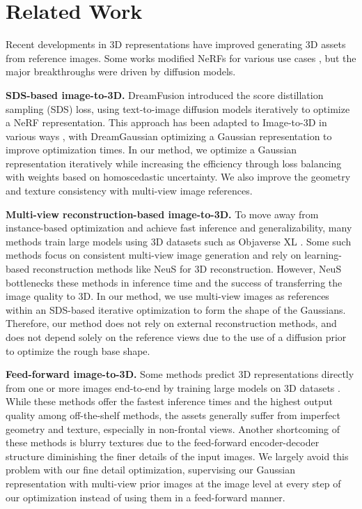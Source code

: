 \section{Related Work}
\label{related_work}
Recent developments in 3D representations have improved generating 3D assets from reference images. Some works modified NeRFs for various use cases \cite{mildenhall2020nerf, Yu_2021_CVPR, 9878785, trevithick2021grf, ZIMNY20248, JIN2024160}, but the major breakthroughs were driven by diffusion models.

\noindent \textbf{SDS-based image-to-3D. }DreamFusion \cite{poole2022dreamfusion} introduced the score distillation sampling (SDS) loss, using text-to-image diffusion models iteratively to optimize a NeRF representation. This approach has been adapted to Image-to-3D in various ways \cite{Tang_2023_ICCV, qian2024magic}, with DreamGaussian \cite{tang2024dreamgaussian} optimizing a Gaussian representation \cite{kerbl3Dgaussians} to improve optimization times. In our method, we optimize a Gaussian representation iteratively while increasing the efficiency through loss balancing with weights based on homoscedastic uncertainty. We also improve the geometry and texture consistency with multi-view image references. 

\noindent \textbf{Multi-view reconstruction-based image-to-3D. }To move away from instance-based optimization and achieve fast inference and generalizability, many methods train large models using 3D datasets such as Objaverse XL \cite{objaverseXL}. Some such methods focus on consistent multi-view image generation \cite{Liu_2023_ICCV, shi2023MVDream, wang2023imagedream, shi2023zero123plus, liu2024syncdreamer, Woo_2024_CVPR, Long_2024_CVPR} and rely on learning-based reconstruction methods like NeuS \cite{wang2021neus} for 3D reconstruction. However, NeuS bottlenecks these methods in inference time and the success of transferring the image quality to 3D. In our method, we use multi-view images as references within an SDS-based iterative optimization to form the shape of the Gaussians. Therefore, our method does not rely on external reconstruction methods, and does not depend solely on the reference views due to the use of a diffusion prior to optimize the rough base shape.%

\noindent \textbf{Feed-forward image-to-3D. } Some methods predict 3D representations directly from one or more images end-to-end by training large models on 3D datasets \cite{hong2024lrm, tang2024lgm, wang2024crm, tochilkin2024triposr, Zou_2024_CVPR}. While these methods offer the fastest inference times and the highest output quality among off-the-shelf methods, the assets generally suffer from imperfect geometry and texture, especially in non-frontal views. Another shortcoming of these methods is blurry textures due to the feed-forward encoder-decoder structure diminishing the finer details of the input images. We largely avoid this problem with our fine detail optimization, supervising our Gaussian representation with multi-view prior images at the image level at every step of our optimization instead of using them in a feed-forward manner.

